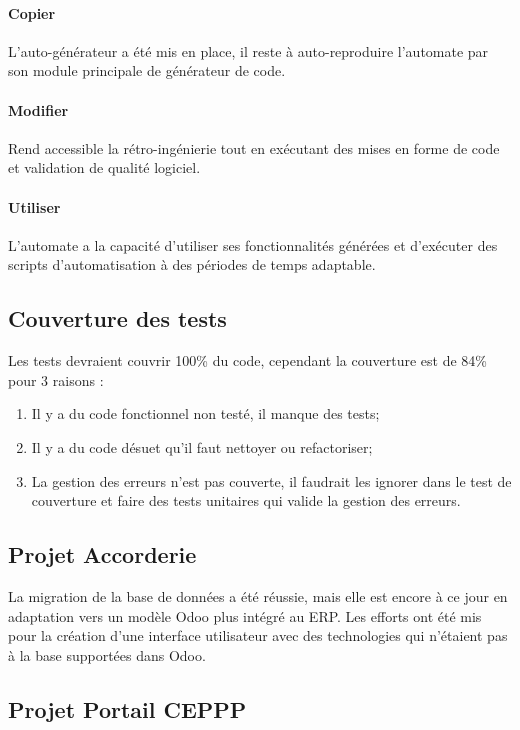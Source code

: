 \paragraph{Copier}
L’auto-générateur a été mis en place, il reste à auto-reproduire l’automate par son module principale de générateur de code.

\paragraph{Modifier}
Rend accessible la rétro-ingénierie tout en exécutant des mises en forme de code et validation de qualité logiciel.

\paragraph{Utiliser}
L’automate a la capacité d’utiliser ses fonctionnalités générées et d’exécuter des scripts d’automatisation à des périodes de temps adaptable.

\subsection{Couverture des tests}

Les tests devraient couvrir 100\% du code, cependant la couverture est de 84\% pour 3 raisons :

\begin{enumerate}
    \item Il y a du code fonctionnel non testé, il manque des tests;
    \item Il y a du code désuet qu’il faut nettoyer ou refactoriser;
    \item La gestion des erreurs n’est pas couverte, il faudrait les ignorer dans le test de couverture et faire des tests unitaires qui valide la gestion des erreurs.
\end{enumerate}

\subsection{Projet Accorderie}
La migration de la base de données a été réussie, mais elle est encore à ce jour en adaptation vers un modèle Odoo plus intégré au ERP. Les efforts ont été mis pour la création d’une interface utilisateur avec des technologies qui n’étaient pas à la base supportées dans Odoo.

\subsection{Projet Portail CEPPP}

